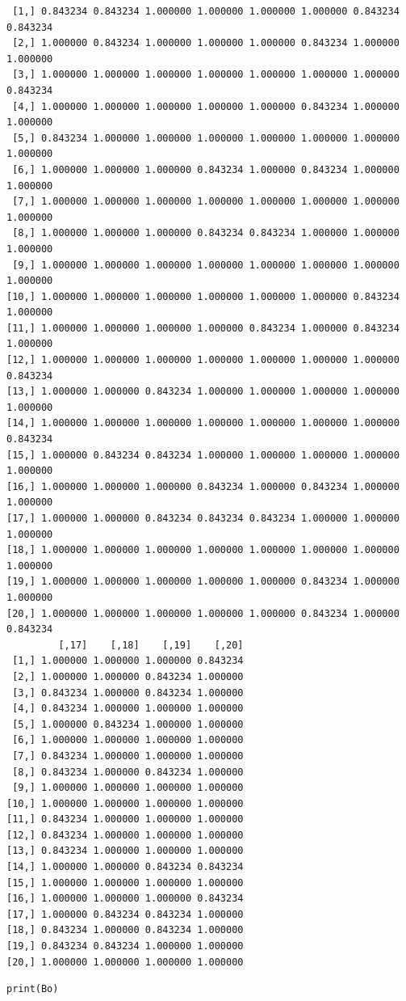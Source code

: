 \documentclass[11pt]{article}
\begin{document}
\begin{enumerate}
\begin{verbatim}
 [1,] 0.843234 0.843234 1.000000 1.000000 1.000000 1.000000 0.843234 0.843234
 [2,] 1.000000 0.843234 1.000000 1.000000 1.000000 0.843234 1.000000 1.000000
 [3,] 1.000000 1.000000 1.000000 1.000000 1.000000 1.000000 1.000000 0.843234
 [4,] 1.000000 1.000000 1.000000 1.000000 1.000000 0.843234 1.000000 1.000000
 [5,] 0.843234 1.000000 1.000000 1.000000 1.000000 1.000000 1.000000 1.000000
 [6,] 1.000000 1.000000 1.000000 0.843234 1.000000 0.843234 1.000000 1.000000
 [7,] 1.000000 1.000000 1.000000 1.000000 1.000000 1.000000 1.000000 1.000000
 [8,] 1.000000 1.000000 1.000000 0.843234 0.843234 1.000000 1.000000 1.000000
 [9,] 1.000000 1.000000 1.000000 1.000000 1.000000 1.000000 1.000000 1.000000
[10,] 1.000000 1.000000 1.000000 1.000000 1.000000 1.000000 0.843234 1.000000
[11,] 1.000000 1.000000 1.000000 1.000000 0.843234 1.000000 0.843234 1.000000
[12,] 1.000000 1.000000 1.000000 1.000000 1.000000 1.000000 1.000000 0.843234
[13,] 1.000000 1.000000 0.843234 1.000000 1.000000 1.000000 1.000000 1.000000
[14,] 1.000000 1.000000 1.000000 1.000000 1.000000 1.000000 1.000000 0.843234
[15,] 1.000000 0.843234 0.843234 1.000000 1.000000 1.000000 1.000000 1.000000
[16,] 1.000000 1.000000 1.000000 0.843234 1.000000 0.843234 1.000000 1.000000
[17,] 1.000000 1.000000 0.843234 0.843234 0.843234 1.000000 1.000000 1.000000
[18,] 1.000000 1.000000 1.000000 1.000000 1.000000 1.000000 1.000000 1.000000
[19,] 1.000000 1.000000 1.000000 1.000000 1.000000 0.843234 1.000000 1.000000
[20,] 1.000000 1.000000 1.000000 1.000000 1.000000 0.843234 1.000000 0.843234
         [,17]    [,18]    [,19]    [,20]
 [1,] 1.000000 1.000000 1.000000 0.843234
 [2,] 1.000000 1.000000 0.843234 1.000000
 [3,] 0.843234 1.000000 0.843234 1.000000
 [4,] 0.843234 1.000000 1.000000 1.000000
 [5,] 1.000000 0.843234 1.000000 1.000000
 [6,] 1.000000 1.000000 1.000000 1.000000
 [7,] 0.843234 1.000000 1.000000 1.000000
 [8,] 0.843234 1.000000 0.843234 1.000000
 [9,] 1.000000 1.000000 1.000000 1.000000
[10,] 1.000000 1.000000 1.000000 1.000000
[11,] 0.843234 1.000000 1.000000 1.000000
[12,] 0.843234 1.000000 1.000000 1.000000
[13,] 0.843234 1.000000 1.000000 1.000000
[14,] 1.000000 1.000000 0.843234 0.843234
[15,] 1.000000 1.000000 1.000000 1.000000
[16,] 1.000000 1.000000 1.000000 0.843234
[17,] 1.000000 0.843234 0.843234 1.000000
[18,] 0.843234 1.000000 0.843234 1.000000
[19,] 0.843234 0.843234 1.000000 1.000000
[20,] 1.000000 1.000000 1.000000 1.000000
\end{verbatim}


\begin{verbatim}
print(Bo)
\end{verbatim}


\end{enumerate}
\end{document}
